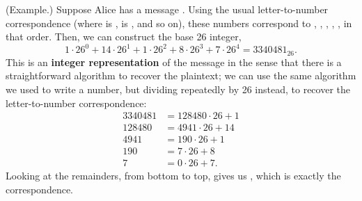 \documentclass[letterpaper]{article}
\begin{document}
\begin{mdframed}
    (Example.) Suppose Alice has a message . Using the usual letter-to-number correspondence (where  is ,  is , and so on), these numbers correspond to , , , , , in that order. Then, we can construct the base 26 integer, \[1 \cdot 26^0 + 14 \cdot 26^1 + 1 \cdot 26^2 + 8 \cdot 26^3 + 7 \cdot 26^4 = 3340481_{26}.\]
    This is an \textbf{integer representation} of the message  in the sense that there is a straightforward algorithm to recover the plaintext; we can use the same algorithm we used to write a number, but dividing repeatedly by 26 instead, to recover the letter-to-number correspondence: 
    \begin{equation*}
        \begin{aligned}
            3340481 &= 128480 \cdot 26 + 1 \\ 
            128480 &= 4941 \cdot 26 + 14 \\ 
            4941 &= 190 \cdot 26 + 1 \\ 
            190 &= 7 \cdot 26 + 8 \\ 
            7 &= 0 \cdot 26 + 7.
        \end{aligned}
    \end{equation*}
    Looking at the remainders, from bottom to top, gives us , which is exactly the correspondence.
\end{mdframed}
\end{document}
